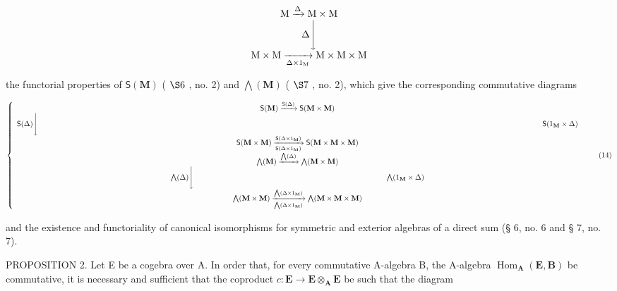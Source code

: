 \[
\begin{array}{c} \mathrm{M} \xrightarrow {\Delta} \mathrm{M} \times \mathrm{M} \\ \Delta \Biggl \downarrow \\ \mathrm{M} \times \mathrm{M} \xrightarrow [ \Delta \times 1 _ {\mathrm{M}} ]{} \mathrm{M} \times \mathrm{M} \times \mathrm{M} \end{array}
\]

the functorial properties of \(\mathsf{S}(\mathbf{M})\) ( \(\S 6\) , no. 2) and \(\bigwedge (\mathbf{M})\) ( \(\S 7\) , no. 2), which give the corresponding commutative diagrams

\[
\left\{ \begin{array}{c} \mathsf {S} (\mathbf {M}) \xrightarrow {\mathsf {S} (\Delta)} \mathsf {S} (\mathbf {M} \times \mathbf {M}) \\ \mathsf {S} (\Delta) \Biggl \downarrow \qquad \qquad \qquad \qquad \qquad \qquad \qquad \qquad \qquad \qquad \qquad \qquad \qquad \qquad \qquad \qquad \qquad \qquad \qquad \qquad \qquad \qquad \qquad \qquad \qquad \qquad \qquad \qquad \qquad \qquad \qquad \qquad \qquad \qquad \mathsf {S} (1 _ {\mathbf {M}} \times \Delta) \\ \mathsf {S} (\mathbf {M} \times \mathbf {M}) \xrightarrow [ \mathsf {S} (\Delta \times 1 _ {\mathbf {M}}) ]{\mathsf {S} (\Delta \times 1 _ {\mathbf {M}})} \mathsf {S} (\mathbf {M} \times \mathbf {M} \times \mathbf {M}) \\ \bigwedge (\mathbf {M}) \xrightarrow {\bigwedge (\Delta)} \bigwedge (\mathbf {M} \times \mathbf {M}) \\ \bigwedge (\Delta) \Biggl \downarrow \qquad \qquad \qquad \qquad \qquad \qquad \qquad \qquad \qquad \qquad \qquad \qquad \qquad \bigwedge (1 _ {\mathbf {M}} \times \Delta) \\ \bigwedge (\mathbf {M} \times \mathbf {M}) \xrightarrow [ \bigwedge (\Delta \times 1 _ {\mathbf {M}}) ]{\bigwedge (\Delta \times 1 _ {\mathbf {M}})} \bigwedge (\mathbf {M} \times \mathbf {M} \times \mathbf {M}) \end{array} \right.\tag{14}
\]

and the existence and functoriality of canonical isomorphisms for symmetric and exterior algebras of a direct sum (§ 6, no. 6 and § 7, no. 7).

PROPOSITION 2. Let E be a cogebra over A. In order that, for every commutative A-algebra B, the A-algebra \(\operatorname{Hom}_{\mathbf{A}}(\mathbf{E}, \mathbf{B})\) be commutative, it is necessary and sufficient that the coproduct \(c: \mathbf{E} \to \mathbf{E} \otimes_{\mathbf{A}} \mathbf{E}\) be such that the diagram

